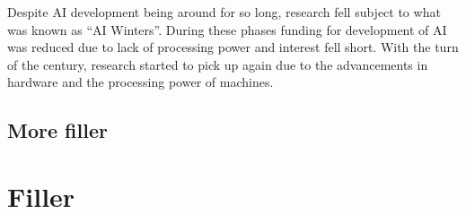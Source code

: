 Despite AI development being around for so long, research fell subject to what was known as “AI Winters”. During these phases funding for development of AI was reduced due to lack of processing power and interest fell short. With the turn of the century, research started to pick up again due to the advancements in hardware and the processing power of machines.


\subsection{More filler}

\section{Filler}